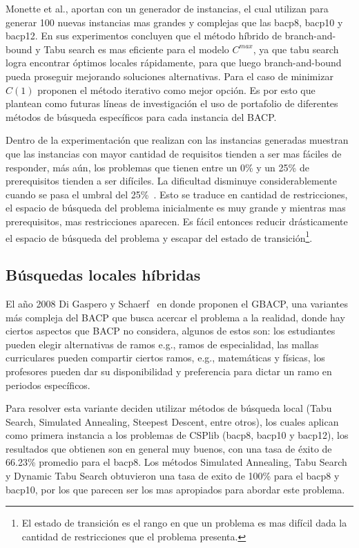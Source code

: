 \documentclass[letterpaper,10pt]{article}
\begin{document}
Monette et al., aportan con un generador de instancias, el cual utilizan para generar 100 nuevas instancias mas grandes y complejas que las bacp8, bacp10 y bacp12. En sus experimentos concluyen que el método híbrido de branch-and-bound y Tabu search es mas eficiente para el modelo $C^{max}$, ya que tabu search logra encontrar óptimos locales rápidamente, para que luego branch-and-bound pueda proseguir mejorando soluciones alternativas. Para el caso de minimizar $C(1)$ proponen el método iterativo como mejor opción. Es por esto que plantean como futuras líneas de investigación el uso de portafolio de diferentes métodos de búsqueda específicos para cada instancia del BACP.

Dentro de la experimentación que realizan con las instancias generadas muestran que las instancias con mayor cantidad de requisitos tienden a ser mas fáciles de responder, más aún, los problemas que tienen entre un 0\% y un 25\% de prerequisitos tienden a ser difíciles. La dificultad disminuye considerablemente cuando se pasa el umbral del 25\%~\cite{Monette07acp}. Esto se traduce en cantidad de restricciones, el espacio de búsqueda del problema inicialmente es muy grande y mientras mas prerequisitos, mas restricciones aparecen. Es fácil entonces reducir drásticamente el espacio de búsqueda del problema y escapar del estado de transición\footnote{El estado de transición es el rango en que un problema es mas difícil dada la cantidad de restricciones que el problema presenta.}.

\subsection{Búsquedas locales híbridas}

El año 2008 Di Gaspero y Schaerf~\cite{GbacpGaspero} en donde proponen el GBACP, una variantes más compleja del BACP que busca acercar el problema a la realidad, donde hay ciertos aspectos que BACP no considera, algunos de estos son:
los estudiantes pueden elegir alternativas de ramos e.g., ramos de especialidad, las mallas curriculares pueden compartir ciertos ramos, e.g., matemáticas y físicas, los profesores pueden dar su disponibilidad y preferencia para dictar un ramo en periodos específicos.

Para resolver esta variante deciden utilizar métodos de búsqueda local (Tabu Search, Simulated Annealing, Steepest Descent, entre otros), los cuales aplican como primera instancia a los problemas de CSPlib (bacp8, bacp10 y bacp12), los resultados que obtienen son en general muy buenos, con una tasa de éxito de 66.23\% promedio para el bacp8. Los métodos Simulated Annealing, Tabu Search y Dynamic Tabu Search obtuvieron una tasa de exito de 100\% para el bacp8 y bacp10, por los que parecen ser los mas apropiados para abordar este problema.
\end{document}
